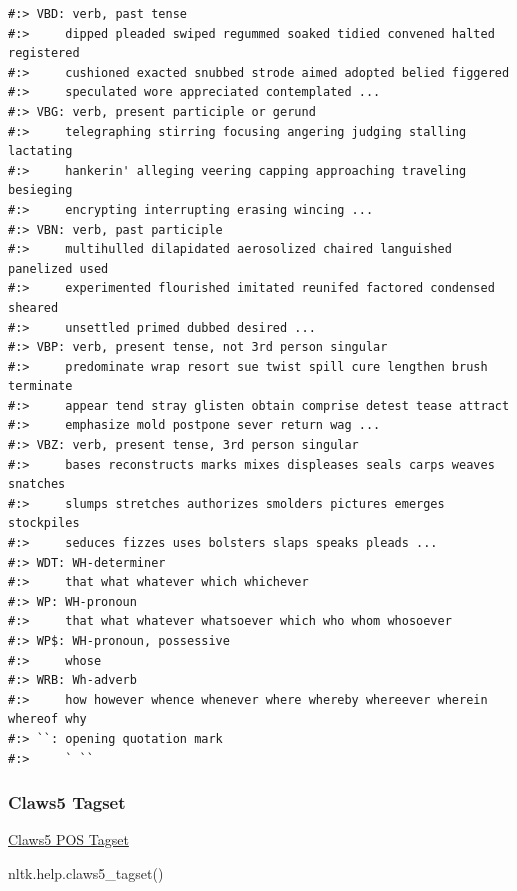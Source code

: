 \documentclass[
]{book}
\newenvironment{Shaded}{\begin{snugshade}}{\end{snugshade}}
\newcommand{\BuiltInTok}[1]{#1}
\newcommand{\NormalTok}[1]{#1}
\begin{document}
\begin{verbatim}
#:> VBD: verb, past tense
#:>     dipped pleaded swiped regummed soaked tidied convened halted registered
#:>     cushioned exacted snubbed strode aimed adopted belied figgered
#:>     speculated wore appreciated contemplated ...
#:> VBG: verb, present participle or gerund
#:>     telegraphing stirring focusing angering judging stalling lactating
#:>     hankerin' alleging veering capping approaching traveling besieging
#:>     encrypting interrupting erasing wincing ...
#:> VBN: verb, past participle
#:>     multihulled dilapidated aerosolized chaired languished panelized used
#:>     experimented flourished imitated reunifed factored condensed sheared
#:>     unsettled primed dubbed desired ...
#:> VBP: verb, present tense, not 3rd person singular
#:>     predominate wrap resort sue twist spill cure lengthen brush terminate
#:>     appear tend stray glisten obtain comprise detest tease attract
#:>     emphasize mold postpone sever return wag ...
#:> VBZ: verb, present tense, 3rd person singular
#:>     bases reconstructs marks mixes displeases seals carps weaves snatches
#:>     slumps stretches authorizes smolders pictures emerges stockpiles
#:>     seduces fizzes uses bolsters slaps speaks pleads ...
#:> WDT: WH-determiner
#:>     that what whatever which whichever
#:> WP: WH-pronoun
#:>     that what whatever whatsoever which who whom whosoever
#:> WP$: WH-pronoun, possessive
#:>     whose
#:> WRB: Wh-adverb
#:>     how however whence whenever where whereby whereever wherein whereof why
#:> ``: opening quotation mark
#:>     ` ``
\end{verbatim}

\hypertarget{claws5-tagset}{%
\subsubsection{Claws5 Tagset}\label{claws5-tagset}}

\href{https://www.sketchengine.eu/english-claws5-part-of-speech-tagset/}{Claws5 POS Tagset}

\begin{Shaded}
\begin{Highlighting}[]
\NormalTok{nltk.}\BuiltInTok{help}\NormalTok{.claws5_tagset()}
\end{Highlighting}
\end{Shaded}
\end{document}
